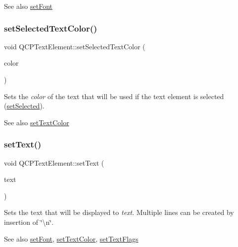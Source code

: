 \begin{DoxySeeAlso}{See also}
\hyperlink{classQCPTextElement_a09b3241769528fa87cb4bf35c97defad}{set\+Font} 
\end{DoxySeeAlso}
\mbox{\label{classQCPTextElement_abaec200cae70a0eade53583defc0476d}} 
\subsubsection{\texorpdfstring{set\+Selected\+Text\+Color()}{setSelectedTextColor()}}
{\footnotesize\ttfamily void Q\+C\+P\+Text\+Element\+::set\+Selected\+Text\+Color (\begin{DoxyParamCaption}\item[{const Q\+Color \&}]{color }\end{DoxyParamCaption})}

Sets the {\itshape color} of the text that will be used if the text element is selected (\hyperlink{classQCPTextElement_aba5521f9fb22a5f3d2f09ab37d4a1751}{set\+Selected}).

\begin{DoxySeeAlso}{See also}
\hyperlink{classQCPTextElement_a4f3b8361c3ffb3f84346954929ce93ba}{set\+Text\+Color} 
\end{DoxySeeAlso}
\mbox{\label{classQCPTextElement_ac44b81e69e719b879eb2feecb33557e2}} 
\subsubsection{\texorpdfstring{set\+Text()}{setText()}}
{\footnotesize\ttfamily void Q\+C\+P\+Text\+Element\+::set\+Text (\begin{DoxyParamCaption}\item[{const Q\+String \&}]{text }\end{DoxyParamCaption})}

Sets the text that will be displayed to {\itshape text}. Multiple lines can be created by insertion of \char`\"{}\textbackslash{}n\char`\"{}.

\begin{DoxySeeAlso}{See also}
\hyperlink{classQCPTextElement_a09b3241769528fa87cb4bf35c97defad}{set\+Font}, \hyperlink{classQCPTextElement_a4f3b8361c3ffb3f84346954929ce93ba}{set\+Text\+Color}, \hyperlink{classQCPTextElement_ab908f437f552020888a3ad8cf8242605}{set\+Text\+Flags} 
\end{DoxySeeAlso}
\mbox{\label{classQCPTextElement_a4f3b8361c3ffb3f84346954929ce93ba}} 
